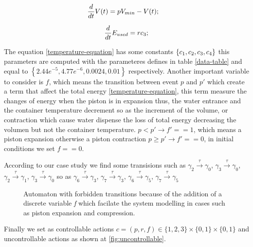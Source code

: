     \begin{equation}
    \frac{d}{dt}V(t) = pV_{min} - V(t); \quad
    \label{volume-equation}
    \end{equation}

    \begin{equation} 
    \frac{d}{dt}E_{used} =  r c_{3} ;
    \label{Energy-equation}
    \end{equation}

    The equation \ref{temperature-equation} has some constants $\left\lbrace 
    c_1, c_{2}, c_{3}, c_{4} \right\rbrace $ this
    parameters are computed with the parameteres defines in table \ref{data-table} 
    and equal to $\left\lbrace 2.44e^{-5},  4.77e^{-6}, 0.0024, 0.01 \right\rbrace$ respectively.
    Another important variable to consider is $f$, which
    means the transition between event $p$ and $p'$ which create a term that affect the total energy
    \autoref{temperature-equation}, this term measure the changes of energy when the
    piston is in expansion thus, the water entrance and the container temperature decrement
    so as the increment of the volume, or contraction which cause water dispense 
    the loss of total energy decreasing the volumen but not the container temperature.
    $p < p' \rightarrow f' == 1$, which means a piston expansion otherwise a piston contraction 
    $p \geqslant p' \rightarrow f' == 0$, in initial conditions we set $f == 0$.
    
    According to our case study we find some transisions such as $\gamma_2 \xrightarrow{\tau} \gamma_{0} $,
    $\gamma_3 \xrightarrow{\tau} \gamma_{0} $, $\gamma_2 \xrightarrow{\tau} \gamma_{1} $,
    $\gamma_3 \xrightarrow{\tau} \gamma_{0} $ so as $\gamma_6 \xrightarrow{\tau} \gamma_{3} $,
    $\gamma_7 \xrightarrow{\tau} \gamma_{3} $, $\gamma_6 \xrightarrow{\tau} \gamma_{5} $,
    $\gamma_7 \xrightarrow{\tau} \gamma_{5} $
    \clearpage

    \begin{figure}[!hbt]
      
      \caption{Automaton with forbidden transitions because of the addition of a 
      discrete variable \emph{f} which facilate the system modelling in cases such
       as piston expansion and compression.}
      \label{fig:automaton}
    \end{figure}

    Finally we set as controllable actions $c = (p,r,f) \in \lbrace 1,2,3 \rbrace \times 
    \lbrace 0,1 \rbrace \times \lbrace 0,1 \rbrace $ and uncontrollable actions 
    as shown at \autoref{fig:uncontrollable}.    
    \clearpage 
